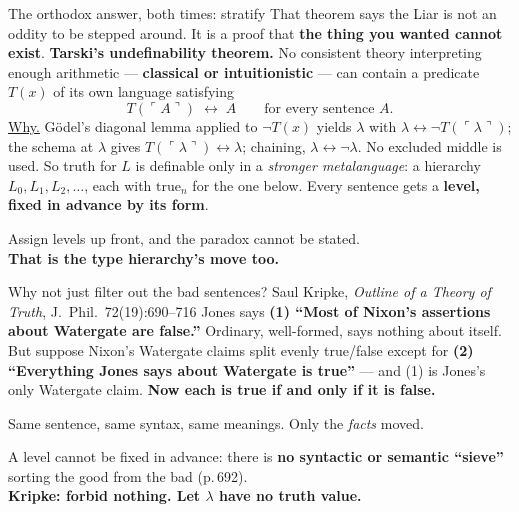 \documentclass[aspectratio=169,11pt]{beamer}
\newcommand{\key}[1]{{\color{accent}\textbf{#1}}}
\newcommand{\bad}[1]{{\color{warn}\textbf{#1}}}
\begin{document}
\begin{frame}{The orthodox answer, both times: stratify}
  \vfill
  That theorem says the Liar is not an oddity to be stepped around. It is a proof
  that \key{the thing you wanted cannot exist}.
  \vfill
  \key{Tarski's undefinability theorem.}\; No consistent theory interpreting enough
  arithmetic --- \key{classical or intuitionistic} --- can contain a predicate $T(x)$
  of its own language satisfying
  \[ T(\ulcorner A\urcorner) \;\leftrightarrow\; A
     \qquad\text{for every sentence } A. \]
  \pause
  {\small \underline{Why.}\; G\"odel's diagonal lemma applied to $\neg T(x)$ yields
   $\lambda$ with $\lambda \leftrightarrow \neg T(\ulcorner\lambda\urcorner)$; the
   schema at $\lambda$ gives $T(\ulcorner\lambda\urcorner) \leftrightarrow \lambda$;
   chaining, $\lambda \leftrightarrow \neg\lambda$. No excluded middle is used.}
  \vfill
  \pause
  So truth for $L$ is definable only in a \emph{stronger metalanguage}: a hierarchy
  $L_0, L_1, L_2, \dots$, each with $\mathrm{true}_n$ for the one below. Every sentence
  gets a \key{level, fixed in advance by its form}.
  \vfill
  \pause
  \begin{center}\Large
    Assign levels up front, and the paradox cannot be stated.\\
    \key{That is the type hierarchy's move too.}
  \end{center}
  \vfill
\end{frame}

\begin{frame}{Why not just filter out the bad sentences?}
  {\small Saul Kripke, \textit{Outline of a Theory of Truth}, J.\ Phil.\ 72(19):690--716}
  \vfill
  Jones says \key{(1) ``Most of Nixon's assertions about Watergate are false.''}
  Ordinary, well-formed, says nothing about itself.
  \vfill
  \pause
  But suppose Nixon's Watergate claims split evenly true/false except for
  \key{(2) ``Everything Jones says about Watergate is true''} --- and (1) is Jones's
  only Watergate claim. \bad{Now each is true if and only if it is false.}
  \vfill
  \pause
  \begin{center}\large
    Same sentence, same syntax, same meanings. Only the \emph{facts} moved.
  \end{center}
  \vfill
  \pause
  \begin{center}
    A level cannot be fixed in advance: there is
    \key{no syntactic or semantic ``sieve''} sorting the good from the bad
    {\small(p.\,692)}.\\[0.5em]
    \Large \key{Kripke: forbid nothing. Let $\lambda$ have no truth value.}
  \end{center}
  \vfill
\end{frame}
\end{document}
